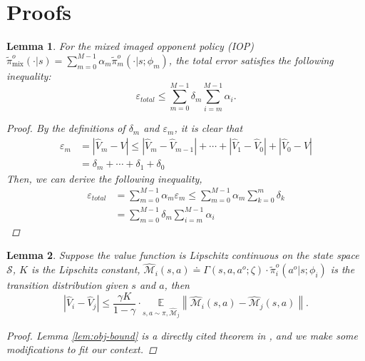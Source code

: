 \documentclass{article}
\newtheorem{lemma}{Lemma}
\begin{document}
\setcounter{lemma}{0}
\setcounter{theorem}{0}
\newpage

\section{Proofs}
\label{app:proof}

\begin{lemma}
For the mixed imaged opponent policy (IOP) $\tilde{\pi}_{\operatorname{mix}}^o(\cdot|s) = \sum\limits_{m=0}^{M-1}\alpha_m\tilde{\pi}^o_m(\cdot|s; \phi_m)$, the total error satisfies the following inequality:
\begin{equation*}\label{eq:total-bound-1}
    \varepsilon_{total}\leq\sum_{m=0}^{M-1}\delta_m\sum_{i=m}^{M-1}\alpha_i.
\end{equation*}
\begin{proof}
By the definitions of $\delta_m$ and $\varepsilon_m$, it is clear that 
\begin{align*}
\varepsilon_{m} &= |\widehat{V}_{m}-V| \leq |\widehat{V}_{m}-\widehat{V}_{m-1}| + \cdots + |\widehat{V}_{1}-\widehat{V}_{0}| + |\widehat{V}_0-V|\\
                & = \delta_{m} + \cdots + \delta_{1} + \delta_0
\end{align*}
Then, we can derive the following inequality,
\begin{align*}
\varepsilon_{total} & = \sum_{m=0}^{M-1}\alpha_m\varepsilon_m \leq \sum_{m=0}^{M-1}\alpha_m\sum_{k=0}^{m}\delta_{k}\\
 & = \sum_{m=0}^{M-1}\delta_m\sum_{i=m}^{M-1}\alpha_i
\end{align*}
\end{proof}
\end{lemma}


\begin{lemma}
Suppose the value function is Lipschitz continuous on the state space $\mathcal{S}$, $K$ is the Lipschitz constant, $\widehat{\mathcal{M}}_i(s,a) \doteq \Gamma(s,a,a^o;\zeta) \cdot \tilde{\pi}^o_i(a^o|s;\phi_i)$ is the transition distribution given $s$ and $a$, then
\begin{equation*}
\left|\widehat{V}_i-\widehat{V}_{j}\right| \leq\frac{\gamma K}{1-\gamma} \cdot\underset{s,a\sim \pi,\widehat{\mathcal{M}}_j}{\mathbb{E}}\left\|\widehat{\mathcal{M}}_i(s, a)-\widehat{\mathcal{M}}_j(s, a)\right\|.
\end{equation*}
\begin{proof}
Lemma \ref{lem:obj-bound} is a directly cited theorem in \citep{algo2019luo}, and we make some modifications to fit our context.
\end{proof}
\end{lemma}
\end{document}
